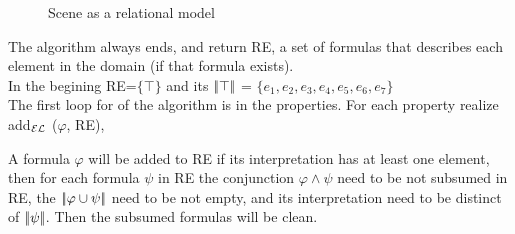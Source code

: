 \begin{figure}
\begin{minipage}[b]{0.6\linewidth}
\caption{Scene as a relational model}\label{GRE3D7-stimulus-graph}
\end{minipage}
\end{figure}


The algorithm always ends, and return RE, a set of formulas that describes each element in the domain (if that formula exists).\\

In the begining RE=$\{\top\}$ and its $|\!|\top|\!|$ = $\{e_1, e_2, e_3, e_4, e_5, e_6, e_7\}$\\

The first loop for of the algorithm is in the properties. For each property realize add$_\mathcal{EL}$ ($\varphi$, RE),

A formula $\varphi$ will be added to RE if its interpretation has at least one element, then for each formula $\psi$ in RE the conjunction 
$\varphi  \wedge \psi$ need to be not subsumed in RE, the $|\!|\varphi \cup \psi|\!|$ need to be not empty, and its interpretation need to be distinct of $|\!|\psi|\!|$. Then the subsumed formulas will be clean.

